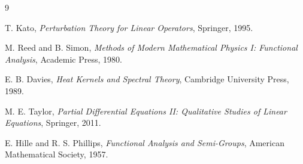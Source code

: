 \documentclass[11pt]{article}
\begin{document}
\begin{thebibliography}{9}

T. Kato,
\emph{Perturbation Theory for Linear Operators},
Springer, 1995.

M. Reed and B. Simon,
\emph{Methods of Modern Mathematical Physics I: Functional Analysis},
Academic Press, 1980.

E. B. Davies,
\emph{Heat Kernels and Spectral Theory},
Cambridge University Press, 1989.

M. E. Taylor,
\emph{Partial Differential Equations II: Qualitative Studies of Linear Equations},
Springer, 2011.

E. Hille and R. S. Phillips,
\emph{Functional Analysis and Semi-Groups},
American Mathematical Society, 1957.

\end{thebibliography}
\end{document}
